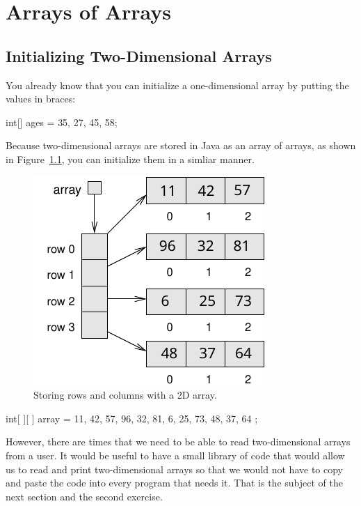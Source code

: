 \chapter{Arrays of Arrays}

\section{Initializing Two-Dimensional Arrays}
You already know that you can initialize a one-dimensional array by putting the values in braces:

\begin{code}
int[] ages = {35, 27, 45, 58};
\end{code}

Because two-dimensional arrays are stored in Java as an array of arrays, as shown in Figure~\ref{fig:2D-array}, you can initialize them in a simliar manner.

\begin{figure}[!ht]
\begin{center}
\includegraphics{figs/ch15/2D-array.pdf}
\caption{Storing rows and columns with a 2D array.}
\label{fig:2D-array} 
\end{center}
\end{figure}

\begin{code}
int[ ][ ] array = {
    {11, 42, 57},
    {96, 32, 81},
    { 6, 25, 73},
    {48, 37, 64}
};
\end{code}

However, there are times that we need to be able to read two-dimensional arrays from a user. It would be useful to have a small library of code that would allow us to read and print two-dimensional arrays so that we would not have to copy and paste the code into every program that needs it. That is the subject of the next section and the second exercise.


